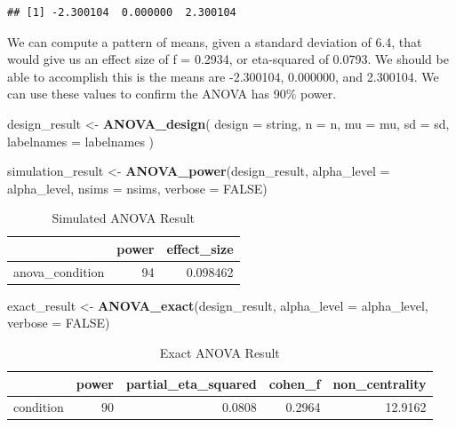 \documentclass[]{book}
\newenvironment{Shaded}{\begin{snugshade}}{\end{snugshade}}
\newcommand{\DataTypeTok}[1]{\textcolor[rgb]{0.13,0.29,0.53}{#1}}
\newcommand{\KeywordTok}[1]{\textcolor[rgb]{0.13,0.29,0.53}{\textbf{#1}}}
\newcommand{\NormalTok}[1]{#1}
\newcommand{\OtherTok}[1]{\textcolor[rgb]{0.56,0.35,0.01}{#1}}
\newcommand{\StringTok}[1]{\textcolor[rgb]{0.31,0.60,0.02}{#1}}
\begin{document}
\begin{verbatim}
## [1] -2.300104  0.000000  2.300104
\end{verbatim}

We can compute a pattern of means, given a standard deviation of 6.4, that would give us an effect size of f = 0.2934, or eta-squared of 0.0793. We should be able to accomplish this is the means are -2.300104, 0.000000, and 2.300104. We can use these values to confirm the ANOVA has 90\% power.

\begin{Shaded}
\begin{Highlighting}[]
\NormalTok{design_result <-}\StringTok{ }\KeywordTok{ANOVA_design}\NormalTok{(}
  \DataTypeTok{design =}\NormalTok{ string,}
  \DataTypeTok{n =}\NormalTok{ n,}
  \DataTypeTok{mu =}\NormalTok{ mu,}
  \DataTypeTok{sd =}\NormalTok{ sd,}
  \DataTypeTok{labelnames =}\NormalTok{ labelnames}
\NormalTok{  )}

\NormalTok{simulation_result <-}\StringTok{ }\KeywordTok{ANOVA_power}\NormalTok{(design_result, }
                                 \DataTypeTok{alpha_level =}\NormalTok{ alpha_level, }
                                 \DataTypeTok{nsims =}\NormalTok{ nsims,}
                                 \DataTypeTok{verbose =} \OtherTok{FALSE}\NormalTok{)}
\end{Highlighting}
\end{Shaded}

\begin{table}[t]

\caption{\label{tab:unnamed-chunk-35}Simulated ANOVA Result}
\centering
\begin{tabular}{l|r|r}
\hline
  & power & effect\_size\\
\hline
anova\_condition & 94 & 0.098462\\
\hline
\end{tabular}
\end{table}

\begin{Shaded}
\begin{Highlighting}[]
\NormalTok{exact_result <-}\StringTok{ }\KeywordTok{ANOVA_exact}\NormalTok{(design_result,}
                            \DataTypeTok{alpha_level =}\NormalTok{ alpha_level,}
                            \DataTypeTok{verbose =} \OtherTok{FALSE}\NormalTok{)}
\end{Highlighting}
\end{Shaded}

\begin{table}[t]

\caption{\label{tab:unnamed-chunk-37}Exact ANOVA Result}
\centering
\begin{tabular}{l|r|r|r|r}
\hline
  & power & partial\_eta\_squared & cohen\_f & non\_centrality\\
\hline
condition & 90 & 0.0808 & 0.2964 & 12.9162\\
\hline
\end{tabular}
\end{table}
\end{document}
